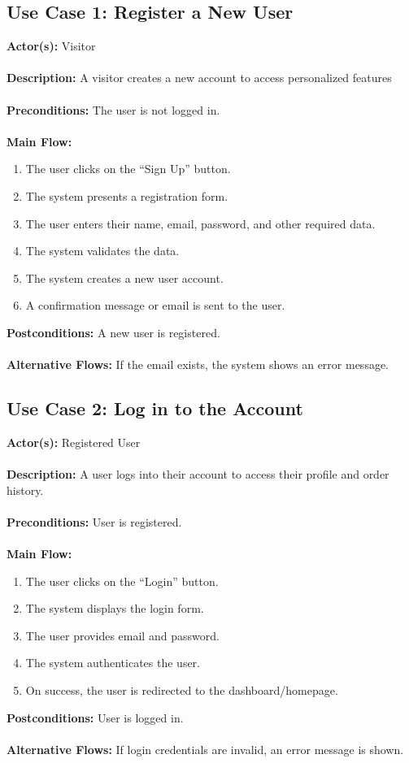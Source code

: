 \documentclass[a4paper,12pt]{article.cls}
\begin{document}
	\subsection*{Use Case 1: Register a New User}
	\textbf{Actor(s):} Visitor \\ \\
	\textbf{Description:} A visitor creates a new account to access personalized features \\ \\
	\textbf{Preconditions:} The user is not logged in. \\ \\
	\textbf{Main Flow:}
	\begin{enumerate}
    		\item The user clicks on the ``Sign Up'' button.
    		\item The system presents a registration form.
    		\item The user enters their name, email, password, and other required data.
    		\item The system validates the data.
    		\item The system creates a new user account.
    		\item A confirmation message or email is sent to the user.
    \end{enumerate}
    \textbf{Postconditions:} A new user is registered. \\ \\
    \textbf{Alternative Flows:} If the email exists, the system shows an error message.


    \subsection*{Use Case 2: Log in to the Account}
	\textbf{Actor(s):} Registered User \\ \\
	\textbf{Description:} A user logs into their account to access their profile and order history. \\ \\
	\textbf{Preconditions:} User is registered. \\ \\
	\textbf{Main Flow:}
	\begin{enumerate}
  		\item The user clicks on the ``Login'' button.
  		\item The system displays the login form.
  		\item The user provides email and password.
  		\item The system authenticates the user.
  		\item On success, the user is redirected to the dashboard/homepage.
	\end{enumerate}
	\textbf{Postconditions:} User is logged in. \\ \\
	\textbf{Alternative Flows:} If login credentials are invalid, an error message is shown.
\end{document}
